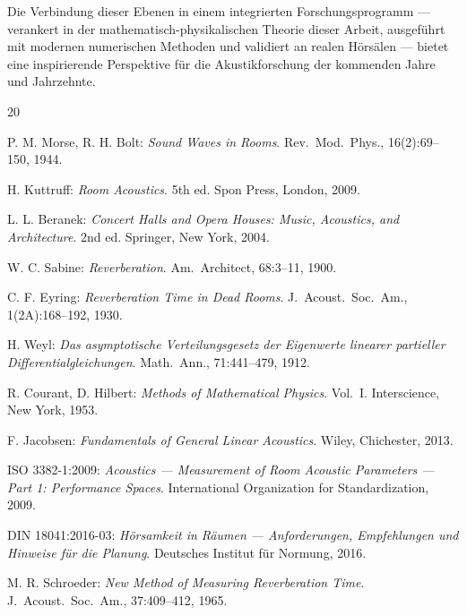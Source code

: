 ﻿\documentclass[12pt, a4paper]{article}
\theoremstyle{definition}
\theoremstyle{remark}
\begin{document}
Die Verbindung dieser Ebenen in einem integrierten Forschungsprogramm
---verankert in der mathematisch-physikalischen Theorie dieser Arbeit,
ausgeführt mit modernen numerischen Methoden und validiert an realen
Hörsälen --- bietet eine inspirierende Perspektive für die Akustikforschung
der kommenden Jahre und Jahrzehnte.

\newpage
\begin{thebibliography}{20}

  P. M. Morse, R. H. Bolt:
  \textit{Sound Waves in Rooms}.
  Rev.\ Mod.\ Phys., 16(2):69--150, 1944.

  H. Kuttruff:
  \textit{Room Acoustics}. 5th ed.
  Spon Press, London, 2009.

  L. L. Beranek:
  \textit{Concert Halls and Opera Houses: Music, Acoustics, and Architecture}.
  2nd ed. Springer, New York, 2004.

  W. C. Sabine:
  \textit{Reverberation}.
  Am.\ Architect, 68:3--11, 1900.

  C. F. Eyring:
  \textit{Reverberation Time in Dead Rooms}.
  J.\ Acoust.\ Soc.\ Am., 1(2A):168--192, 1930.

  H. Weyl:
  \textit{Das asymptotische Verteilungsgesetz der Eigenwerte linearer
  partieller Differentialgleichungen}.
  Math.\ Ann., 71:441--479, 1912.

  R. Courant, D. Hilbert:
  \textit{Methods of Mathematical Physics}. Vol.\ I.
  Interscience, New York, 1953.

  F. Jacobsen:
  \textit{Fundamentals of General Linear Acoustics}.
  Wiley, Chichester, 2013.

  ISO 3382-1:2009:
  \textit{Acoustics --- Measurement of Room Acoustic Parameters ---
  Part 1: Performance Spaces}.
  International Organization for Standardization, 2009.

  DIN 18041:2016-03:
  \textit{Hörsamkeit in Räumen --- Anforderungen, Empfehlungen und Hinweise
  für die Planung}.
  Deutsches Institut für Normung, 2016.

  M. R. Schroeder:
  \textit{New Method of Measuring Reverberation Time}.
  J.\ Acoust.\ Soc.\ Am., 37:409--412, 1965.


\end{thebibliography}
\end{document}

